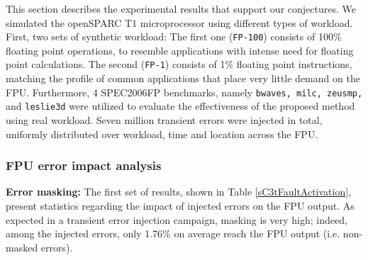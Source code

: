 \documentclass[12pt]{yalephd}
\begin{document}
This section describes the experimental results that support our conjectures. We simulated the openSPARC T1 microprocessor using different types of workload. First, two sets of synthetic workload: The first one ({\tt FP-100}) consists of 100\% floating point operations, to resemble applications with intense need for floating point calculations. The second ({\tt FP-1}) consists of 1\% floating point instructions, matching the profile of common applications that place very little demand on the FPU. Furthermore, 4 SPEC2006FP benchmarks, namely {\tt bwaves, milc, zeusmp,} and {\tt leslie3d} were utilized to evaluate the effectiveness of the proposed method using real workload. Seven million transient errors were injected in total, uniformly distributed over workload, time and location across the FPU.

\subsubsection{FPU error impact analysis}

{\bf Error masking:} The first set of results, shown in Table \ref{sC3tFaultActivation}, present statistics regarding the impact of injected errors on the FPU output. As expected in a transient error injection campaign, masking is very high; indeed, among the injected errors, only 1.76\% on average reach the FPU output (i.e. non-masked errors).
\end{document}
